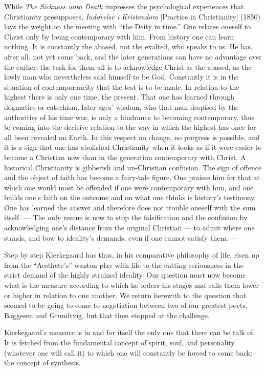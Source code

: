 \documentclass[12pt,a4paper]{book}
\newcommand{\opage}[1]{\marginnote{\footnotesize\textit{[#1]}}}
\begin{document}
While \emph{The Sickness unto Death} impresses the \opage{164}psychological experiences that Christianity
presupposes, \emph{Indøvelse i Kristendom} [Practice in Christianity] (1850) lays the weight on
the meeting with ``the Deity in time.'' One relates oneself to Christ only by being contemporary
with him. From history one can learn nothing. It is constantly the abased, not the exalted, who
speaks to us. He has, after all, not yet come back, and the later generations can have no advantage
over the earlier; the task for them all is to acknowledge Christ as the abased, as the lowly man
who nevertheless said himself to be God. Constantly it is in the situation of contemporaneity that
the test is to be made. In relation to the highest there is only one time, the present. That one
has learned through dogmatics or catechism, later ages' wisdom, who that man despised by the
authorities of his time was, is only a hindrance to becoming contemporary, thus to coming into the
decisive relation to the way in which the highest has once for all been revealed on Earth. In this
respect no change, no progress is possible, and it is a sign that one has abolished Christianity
when it looks as if it were easier to become a Christian now than in the generation contemporary
with Christ. A historical Christianity is gibberish and un-Christian confusion. The sign of offence
and the object of faith has become a fairy-tale figure. One praises him for that at which one would
most be offended if one were contemporary with him, and one builds one's faith on the outcome and
on what one thinks is history's testimony. One has learned the answer and therefore does not
trouble oneself with the sum itself. --- The only rescue is now to stop the falsification and the
confusion by acknowledging one's distance from the original Christian --- to admit where one
stands, and bow to ideality's demands, even if one cannot satisfy them. ---

Step by step Kierkegaard has thus, in his comparative philosophy of life, risen up from the
``Aesthete's'' wanton play with life to the cutting seriousness in the strict demand of the highly
strained ideality. Our question must now become what is the measure according to which he orders
his stages and calls them lower or higher in relation to one another. \opage{165}We return herewith to the
question that seemed to be going to come to negotiation between two of our greatest poets, Baggesen
and Grundtvig, but that then stopped at the challenge.

Kierkegaard's measure is in and for itself the only one that there can be talk of. It is fetched
from the fundamental concept of spirit, soul, and personality (whatever one will call it) to which
one will constantly be forced to come back: the concept of synthesis.
\end{document}
